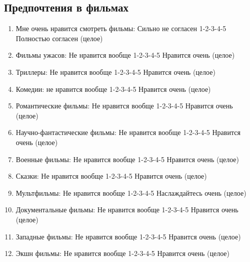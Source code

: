 \documentclass[11pt]{article}
\begin{document}
\subsection{Предпочтения в фильмах}
\begin{enumerate}
\item Мне очень нравится смотреть фильмы: Сильно не согласен 1-2-3-4-5 Полностью согласен (целое)
\item Фильмы ужасов: Не нравится вообще 1-2-3-4-5 Нравится очень (целое)
\item Триллеры: Не нравится вообще 1-2-3-4-5 Нравится очень (целое)
\item Комедии: не нравится вообще 1-2-3-4-5 Нравится очень (целое)
\item Романтические фильмы: Не нравится вообще 1-2-3-4-5 Нравится очень (целое)
\item Научно-фантастические фильмы: Не нравится вообще 1-2-3-4-5 Нравится очень (целое)
\item Военные фильмы: Не нравится вообще 1-2-3-4-5 Нравится очень (целое)
\item Сказки: Не нравится вообще 1-2-3-4-5 Нравится очень (целое)
\item Мультфильмы: Не нравится вообще 1-2-3-4-5 Наслаждайтесь очень (целое)
\item Документальные фильмы: Не нравится вообще 1-2-3-4-5 Нравится очень (целое)
\item Западные фильмы: Не нравится вообще 1-2-3-4-5 Нравится очень (целое)
\item Экшн фильмы: Не нравится вообще 1-2-3-4-5 Нравится очень (целое)
\end{enumerate}
\end{document}

